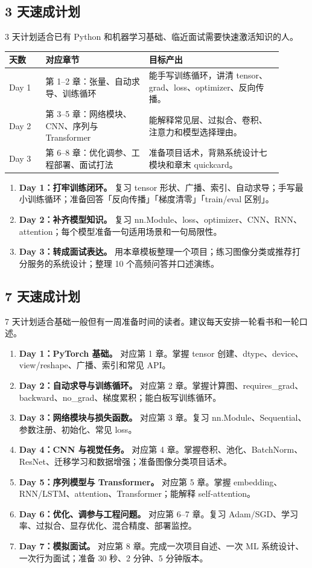 \subsection{3 天速成计划}
3 天计划适合已有 Python 和机器学习基础、临近面试需要快速激活知识的人。
\begin{table}[htbp]
  \centering
  \begin{tabular}{p{0.12\linewidth}p{0.34\linewidth}p{0.44\linewidth}}
    \toprule
    天数 & 对应章节 & 目标产出 \\
    \midrule
    Day 1 & 第 1--2 章：张量、自动求导、训练循环 & 能手写训练循环，讲清 tensor、grad、loss、optimizer、反向传播。 \\
    Day 2 & 第 3--5 章：网络模块、CNN、序列与 Transformer & 能解释常见层、过拟合、卷积、注意力和模型选择理由。 \\
    Day 3 & 第 6--8 章：优化调参、工程部署、面试打法 & 准备项目话术，背熟系统设计七模块和章末 quickcard。 \\
    \bottomrule
  \end{tabular}
\end{table}
\begin{enumerate}[leftmargin=2em]
  \item \textbf{Day 1：打牢训练闭环。} 复习 tensor 形状、广播、索引、自动求导；手写最小训练循环；准备回答「反向传播」「梯度清零」「train/eval 区别」。
  \item \textbf{Day 2：补齐模型知识。} 复习 nn.Module、loss、optimizer、CNN、RNN、attention；每个模型准备一句适用场景和一句局限性。
  \item \textbf{Day 3：转成面试表达。} 用本章模板整理一个项目；练习图像分类或推荐打分服务的系统设计；整理 10 个高频问答并口述演练。
\end{enumerate}
\subsection{7 天速成计划}
7 天计划适合基础一般但有一周准备时间的读者。建议每天安排一轮看书和一轮口述。
\begin{enumerate}[leftmargin=2em]
  \item \textbf{Day 1：PyTorch 基础。} 对应第 1 章。掌握 tensor 创建、dtype、device、view/reshape、广播、索引和常见 API。
  \item \textbf{Day 2：自动求导与训练循环。} 对应第 2 章。掌握计算图、requires\_grad、backward、no\_grad、梯度累积；能白板写训练循环。
  \item \textbf{Day 3：网络模块与损失函数。} 对应第 3 章。复习 nn.Module、Sequential、参数注册、初始化、常见 loss。
  \item \textbf{Day 4：CNN 与视觉任务。} 对应第 4 章。掌握卷积、池化、BatchNorm、ResNet、迁移学习和数据增强；准备图像分类项目话术。
  \item \textbf{Day 5：序列模型与 Transformer。} 对应第 5 章。掌握 embedding、RNN/LSTM、attention、Transformer；能解释 self-attention。
  \item \textbf{Day 6：优化、调参与工程问题。} 对应第 6--7 章。复习 Adam/SGD、学习率、过拟合、显存优化、混合精度、部署监控。
  \item \textbf{Day 7：模拟面试。} 对应第 8 章。完成一次项目自述、一次 ML 系统设计、一次行为面试；准备 30 秒、2 分钟、5 分钟版本。
\end{enumerate}
